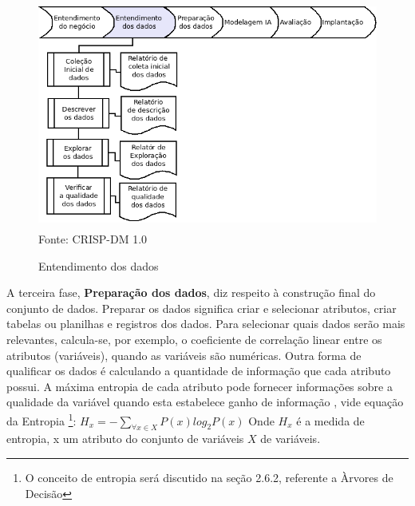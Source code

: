 \begin{figure}[!ht]
\centering
\caption{Entendimento dos dados}
\vspace{1mm}
\includegraphics[width=120mm, height=75mm]{Figuras/Cronograma/EntendDados.png}\\
\tiny Fonte: CRISP-DM 1.0
\end{figure}

\pagebreak


A terceira fase, \textbf{Preparação dos dados}, diz respeito à construção final do conjunto de dados. 
Preparar os dados significa criar e selecionar atributos, criar tabelas ou planilhas e registros dos dados.
Para selecionar quais dados serão mais relevantes, calcula-se, por exemplo, o coeficiente de correlação linear entre os atributos (variáveis), quando as variáveis são numéricas. Outra forma de qualificar os dados é calculando a quantidade de informação que cada atributo possui. A máxima entropia de cada atributo pode fornecer informações sobre a qualidade da variável quando esta estabelece ganho de informação \cite{NorvigRussel2004}, vide equação da Entropia \footnote{O conceito de entropia será discutido na seção 2.6.2, referente a Àrvores de Decisão}: $ H_{x}=-\sum_{\forall x \in X}P(x)log_{2}P(x) $
Onde $ H_{x} $ é a medida de entropia, x um atributo do conjunto de variáveis $X$ de variáveis. 


